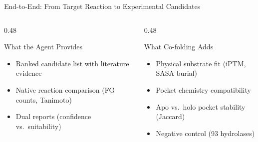\documentclass[aspectratio=169, 11pt]{beamer}
\begin{document}
\begin{frame}{End-to-End: From Target Reaction to Experimental Candidates}
\begin{center}
\begin{tikzpicture}
\end{tikzpicture}
\end{center}

\vspace{4pt}
\begin{columns}[T]
\begin{column}{0.48\textwidth}
\begin{block}{\small What the Agent Provides}
\begin{itemize}\scriptsize
\item Ranked candidate list with literature evidence
\item Native reaction comparison (FG counts, Tanimoto)
\item Dual reports (confidence vs.\ suitability)
\end{itemize}
\end{block}
\end{column}
\begin{column}{0.48\textwidth}
\begin{block}{\small What Co-folding Adds}
\begin{itemize}\scriptsize
\item Physical substrate fit (iPTM, SASA burial)
\item Pocket chemistry compatibility
\item Apo vs.\ holo pocket stability (Jaccard)
\item Negative control (93 hydrolases)
\end{itemize}
\end{block}
\end{column}
\end{columns}
\end{frame}
\end{document}
